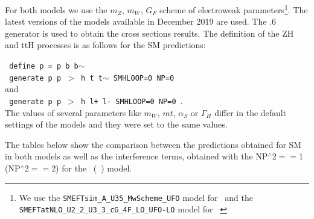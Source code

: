 For both models we use the $m_Z$, $m_W$, $G_F$ scheme of electroweak parameters\footnote{We use the \texttt{SMEFTsim\_A\_U35\_MwScheme\_UFO} model for \SMEFTsim\ and the \texttt{SMEFTatNLO\_U2\_2\_U3\_3\_cG\_4F\_LO\_UFO-LO} model for \SMEFTatNLO\ }. The latest versions of the models available in December 2019 are used.  The .6 generator is used to obtain the cross sections results. The definition of the ZH and ttH processes is as follows for the SM predictions:

\noindent
  \texttt{ define p = p b b$\sim$ }\\
  \texttt{ generate p p $>$ h t t$\sim$ SMHLOOP=0 NP=0 }\\
and \\ 
  \texttt{ generate p p $>$ h l+ l- SMHLOOP=0  NP=0     }.\\
  
  The values of several parameters like $m_W$, $mt$, $\alpha_S$ or $\Gamma_{H}$ differ in the default settings of the models and they were set to the same values.

  The tables below show the comparison between the predictions obtained for SM in both models as well as the interference terms, obtained with the NP$^{\wedge}$2$==$1 (NP$^{\wedge}$2$==$2)  for the \SMEFTsim\ (\SMEFTatNLO\ ) model.


